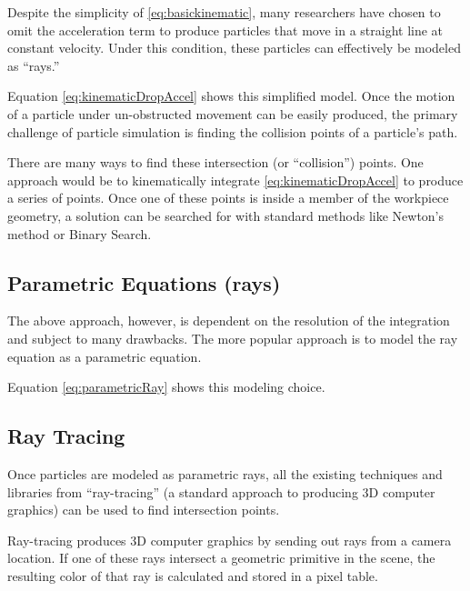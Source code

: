 Despite the simplicity of \eqref{eq:basickinematic}, many researchers have chosen to omit the acceleration term to produce particles that move in a straight line at constant velocity. Under this condition, these particles can effectively be modeled as ``rays.''



Equation \eqref{eq:kinematicDropAccel} shows this simplified model. Once the motion of a particle under un-obstructed movement can be easily produced, the primary challenge of particle simulation is finding the collision points of a particle's path.

There are many ways to find these intersection (or ``collision'') points. One approach would be to kinematically integrate \eqref{eq:kinematicDropAccel} to produce a series of points. Once one of these points is inside a member of the workpiece geometry, a solution can be searched for with standard methods like Newton's method or Binary Search.

	\subsection{Parametric Equations (rays)}

The above approach, however, is dependent on the resolution of the integration and subject to many drawbacks. The more popular approach is to model the ray equation as a parametric equation.

 {
	\label{eq:parametricRay}	
}

Equation \eqref{eq:parametricRay} shows this modeling choice.


	\subsection{Ray Tracing}

Once particles are modeled as parametric rays, all the existing techniques and libraries from ``ray-tracing'' (a standard approach to producing 3D computer graphics) can be used to find intersection points.

Ray-tracing produces 3D computer graphics by sending out rays from a camera location. If one of these rays intersect a geometric primitive in the scene, the resulting color of that ray is calculated and stored in a pixel table.

